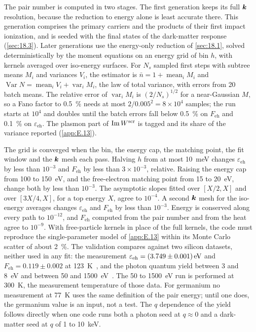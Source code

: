 The pair number is computed in two stages. The first generation keeps its full $\bm{k}$ resolution, because the reduction to energy alone is least accurate there. This generation comprises the primary carriers and the products of their first impact ionization, and is seeded with the final states of the dark-matter response (\cref{sec:18.3}). Later generations use the energy-only reduction of \cref{sec:18.1}, solved deterministically by the moment equations on an energy grid of bin $h$, with kernels averaged over iso-energy surfaces. For $N_s$ sampled first steps with subtree means $M_i$ and variances $V_i$, the estimator is $\bar n = 1 + \operatorname{mean}_iM_i$ and $\operatorname{Var}N = \operatorname{mean}_iV_i + \operatorname{var}_iM_i$, the law of total variance, with errors from 20 batch means. The relative error of $\operatorname{var}_iM_i$ is $(2/N_s)^{1/2}$ for a near-Gaussian $M$, so a Fano factor to \SI{0.5}{\percent} needs at most $2/0.005^2 = 8\times10^4$ samples; the run starts at $10^4$ and doubles until the batch errors fall below \SI{0.5}{\percent} on $F_{\mathrm{eh}}$ and \SI{0.1}{\percent} on $\varepsilon_{\mathrm{eh}}$. The plasmon part of $\operatorname{Im} W^{\mathrm{scr}}$ is tagged and its share of the variance reported (\cref{app:E.13}).

The grid is converged when the bin, the energy cap, the matching point, the fit window and the $\bm{k}$ mesh each pass. Halving $h$ from at most \SI{10}{meV} changes $\varepsilon_{\mathrm{eh}}$ by less than $10^{-3}$ and $F_{\mathrm{eh}}$ by less than $3\times10^{-3}$, relative. Raising the energy cap from 100 to \SI{150}{eV}, and the free-electron matching point from 15 to \SI{20}{eV}, change both by less than $10^{-3}$. The asymptotic slopes fitted over $[X/2, X]$ and over $[3X/4, X]$, for a top energy $X$, agree to $10^{-4}$. A second $\bm{k}$ mesh for the iso-energy averages changes $\varepsilon_{\mathrm{eh}}$ and $F_{\mathrm{eh}}$ by less than $10^{-3}$. Energy is conserved along every path to $10^{-12}$, and $F_{\mathrm{eh}}$ computed from the pair number and from the heat agree to $10^{-9}$. With free-particle kernels in place of the full kernels, the code must reproduce the single-parameter model of \cref{app:E.13} within its Monte Carlo scatter of about \SI{2}{\percent}. The validation compares against two silicon datasets, neither used in any fit: the measurement $\varepsilon_{\mathrm{eh}} = \SI{3.749 \pm 0.001}{eV}$ and $F_{\mathrm{eh}} = 0.119 \pm 0.002$ at \SI{123}{K}~\cite{rodrigues2021absolute}, and the photon quantum yield between 3 and \SI{8}{eV} and between 50 and \SI{1500}{eV}~\cite{ramanathan2020ionization}. The 50 to \SI{1500}{eV} run is performed at \SI{300}{K}, the measurement temperature of those data. For germanium no measurement at \SI{77}{K} uses the same definition of the pair energy; until one does, the germanium value is an input, not a test. The $q$ dependence of the yield follows directly when one code runs both a photon seed at $q \approx 0$ and a dark-matter seed at $q$ of 1 to \SI{10}{keV}.

